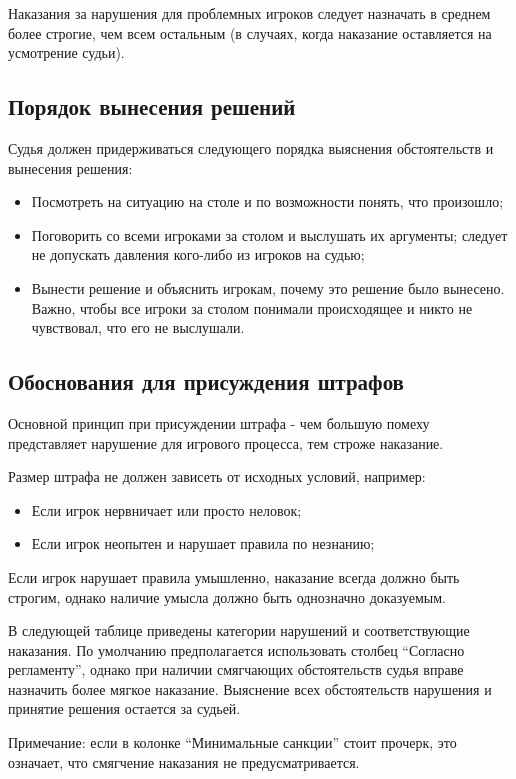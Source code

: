 Наказания за нарушения для проблемных игроков следует назначать в среднем более строгие, чем всем остальным (в случаях, когда наказание оставляется на усмотрение судьи).

\subsection{Порядок вынесения решений}

Судья должен придерживаться следующего порядка выяснения обстоятельств и вынесения решения:
\begin{itemize}
	\item Посмотреть на ситуацию на столе и по возможности понять, что произошло;
	\item Поговорить со всеми игроками за столом и выслушать их аргументы; следует не допускать давления кого-либо из игроков на судью;
	\item Вынести решение и объяснить игрокам, почему это решение было вынесено. Важно, чтобы все игроки за столом понимали происходящее и никто не чувствовал, что его не выслушали.
\end{itemize}

\subsection{Обоснования для присуждения штрафов}

Основной принцип при присуждении штрафа - чем большую помеху представляет нарушение для игрового процесса, тем строже наказание.

Размер штрафа не должен зависеть от исходных условий, например:
\begin{itemize}
	\item Если игрок нервничает или просто неловок;
	\item Если игрок неопытен и нарушает правила по незнанию;
\end{itemize}

Если игрок нарушает правила умышленно, наказание всегда должно быть строгим, однако наличие умысла должно быть однозначно доказуемым.

В следующей таблице приведены категории нарушений и соответствующие наказания. По умолчанию предполагается использовать столбец “Согласно регламенту”, однако при наличии смягчающих обстоятельств судья вправе назначить более мягкое наказание. Выяснение всех обстоятельств нарушения и принятие решения остается за судьей. 

Примечание: если в колонке “Минимальные санкции” стоит прочерк, это означает, что смягчение наказания не предусматривается.

